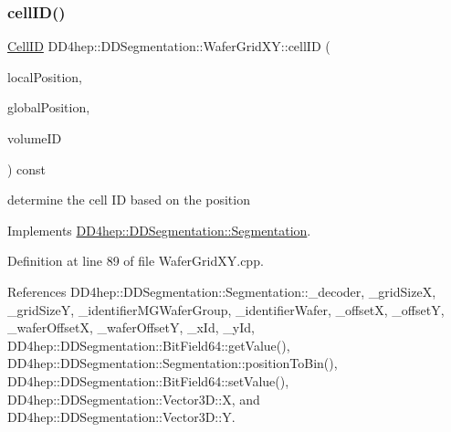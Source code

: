\subsubsection{\texorpdfstring{cell\+I\+D()}{cellID()}}
{\footnotesize\ttfamily \hyperlink{namespace_d_d4hep_1_1_d_d_segmentation_ac7af071d85cb48820914434a07e21ba1}{Cell\+ID} D\+D4hep\+::\+D\+D\+Segmentation\+::\+Wafer\+Grid\+X\+Y\+::cell\+ID (\begin{DoxyParamCaption}\item[{const \hyperlink{struct_d_d4hep_1_1_d_d_segmentation_1_1_vector3_d}{Vector3D} \&}]{local\+Position,  }\item[{const \hyperlink{struct_d_d4hep_1_1_d_d_segmentation_1_1_vector3_d}{Vector3D} \&}]{global\+Position,  }\item[{const \hyperlink{namespace_d_d4hep_1_1_d_d_segmentation_a61a6833a18d1800bdef176595f83e3ba}{Volume\+ID} \&}]{volume\+ID }\end{DoxyParamCaption}) const\hspace{0.3cm}{\ttfamily [virtual]}}



determine the cell ID based on the position 



Implements \hyperlink{class_d_d4hep_1_1_d_d_segmentation_1_1_segmentation_ad5a60953d96d409850d8192f64f8ce3c}{D\+D4hep\+::\+D\+D\+Segmentation\+::\+Segmentation}.



Definition at line 89 of file Wafer\+Grid\+X\+Y.\+cpp.



References D\+D4hep\+::\+D\+D\+Segmentation\+::\+Segmentation\+::\+\_\+decoder, \+\_\+grid\+SizeX, \+\_\+grid\+SizeY, \+\_\+identifier\+M\+G\+Wafer\+Group, \+\_\+identifier\+Wafer, \+\_\+offsetX, \+\_\+offsetY, \+\_\+wafer\+OffsetX, \+\_\+wafer\+OffsetY, \+\_\+x\+Id, \+\_\+y\+Id, D\+D4hep\+::\+D\+D\+Segmentation\+::\+Bit\+Field64\+::get\+Value(), D\+D4hep\+::\+D\+D\+Segmentation\+::\+Segmentation\+::position\+To\+Bin(), D\+D4hep\+::\+D\+D\+Segmentation\+::\+Bit\+Field64\+::set\+Value(), D\+D4hep\+::\+D\+D\+Segmentation\+::\+Vector3\+D\+::X, and D\+D4hep\+::\+D\+D\+Segmentation\+::\+Vector3\+D\+::Y.

\hypertarget{class_d_d4hep_1_1_d_d_segmentation_1_1_wafer_grid_x_y_a4e211babbc74601240aba4ce6c683d2b}{}\label{class_d_d4hep_1_1_d_d_segmentation_1_1_wafer_grid_x_y_a4e211babbc74601240aba4ce6c683d2b} 
